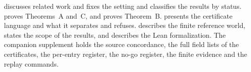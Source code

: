  discusses related work and  fixes the setting and
classifies the results by status.
 proves Theorems~A and~C, and  proves
Theorem~B.  presents the certificate language and
 what it separates and refuses.  describes the finite
reference world,  states the scope of the results, and 
describes the Lean formalization. The companion supplement holds the source concordance,
the full field lists of the certificates, the per-entry register, the no-go register, the
finite evidence and the replay commands.
